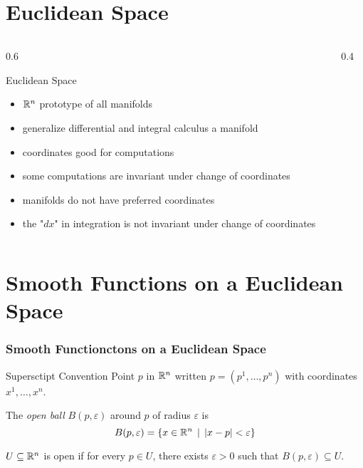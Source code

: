 
% 


\section{Euclidean Space}
\begin{frame}
\begin{columns}
  \begin{column}
    {0.6\textwidth}
    \begin{block}
      {Euclidean Space}
      \begin{itemize}
        \item \(\mathbb R^n\) prototype of all manifolds
        \item generalize differential and integral calculus a manifold
        \item coordinates good for computations
        \item some computations are invariant under change of coordinates
        \item manifolds do not have preferred coordinates
        \item the "$dx$" in integration is not invariant under change of coordinates
      \end{itemize}
    \end{block}
  \end{column}
  \begin{column}
    {0.4\textwidth}
  \end{column}
\end{columns}
\section{Smooth Functions on a Euclidean Space}

\end{frame}
\begin{frame}
  \frametitle{Smooth Functionctons on a Euclidean Space}
  \begin{block}
    {Supersctipt Convention}
    Point $p$ in $\mathbb R^n$ written $p = (p^1, \dots, p^n)$ with 
    coordinates $x^1, \dots, x^n$.
  \end{block}
  \begin{definition}
    The {\em open ball} $B(p, \varepsilon)$ around $p$ of radius $\varepsilon$ is
    \begin{displaymath}
      B(p, \varepsilon) = \{x \in \mathbb R^n \, \mid \, |x - p| < \varepsilon\}
    \end{displaymath}
  \end{definition}
  \begin{definition}
    $U \subseteq \mathbb R^n$ is open if for every $p \in U$, there exists
    $\varepsilon > 0$ such that $B(p, \varepsilon) \subseteq U$.
  \end{definition}
\end{frame}
